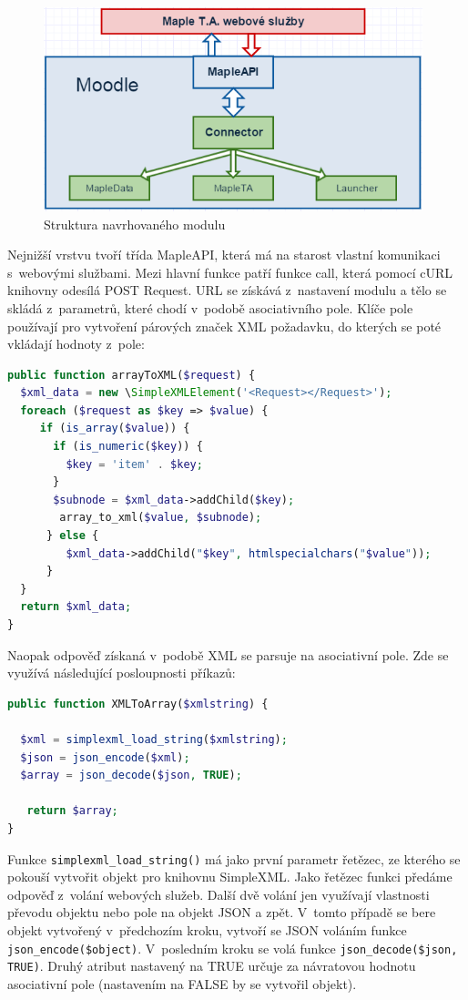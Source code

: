 \documentclass[
print,
  11pt,
  table,   
  nolof,    
  nolot,
  oneside,final
]{fithesis3}
\begin{document}
		\begin{figure}[htb]
		  \begin{center}
		    \includegraphics[width=110mm]{images/struktura_modulu.png}
		   \end{center}
		  \caption{Struktura navrhovaného modulu}
		  \label{fig:strukturamodulu}
		\end{figure}
Nejnižší vrstvu tvoří třída MapleAPI, která má na starost vlastní komunikaci s~webovými službami. Mezi hlavní funkce patří funkce call, která pomocí cURL knihovny odesílá POST Request. URL se získává z~nastavení modulu a tělo se skládá z~parametrů, které chodí v~podobě asociativního pole. Klíče pole používají pro vytvoření párových značek XML požadavku, do kterých se poté vkládají hodnoty z~pole:
\begin{lstlisting}[language=PHP, caption=Algoritmus k~převedení asociativního pole na XML]
public function arrayToXML($request) {
  $xml_data = new \SimpleXMLElement('<Request></Request>');
  foreach ($request as $key => $value) {
     if (is_array($value)) {
       if (is_numeric($key)) {
         $key = 'item' . $key;
       }
       $subnode = $xml_data->addChild($key);
        array_to_xml($value, $subnode);
      } else {
         $xml_data->addChild("$key", htmlspecialchars("$value"));
      }
  }
  return $xml_data;
}
\end{lstlisting}

Naopak odpověď získaná v~podobě XML se parsuje na asociativní pole. Zde se využívá následující posloupnosti příkazů:
\begin{lstlisting}[language=PHP, caption=Převedení XML na asociativní pole.]
public function XMLToArray($xmlstring) {
    
  $xml = simplexml_load_string($xmlstring);
  $json = json_encode($xml);
  $array = json_decode($json, TRUE);

   return $array;
}

\end{lstlisting}
 Funkce \texttt{simplexml\_load\_string()} má jako první parametr řetězec, ze kterého se pokouší vytvořit objekt pro knihovnu SimpleXML. Jako řetězec funk\-ci předáme odpověď z~volání webových služeb. Další dvě volání jen využívají vlastnosti převodu objektu nebo pole na objekt JSON a zpět. V~tomto případě se bere objekt vytvořený v~předchozím kroku, vytvoří se JSON voláním funkce \texttt{json\_encode(\$object)}. V~posledním kroku se volá funkce \texttt{json\_decode(\$json, TRUE)}. Druhý atribut nastavený na TRUE určuje za návratovou hodnotu asociativní pole (nastavením na FALSE by se vytvořil objekt).
	
\end{document}
